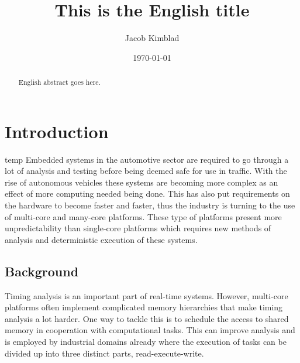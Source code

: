 \documentclass{kththesis}
\title{This is the English title}
\author{Jacob Kimblad}
\date{\today}
\begin{document}

\frontmatter

\titlepage

\begin{abstract} 

    English abstract goes here.

\end{abstract}


\begin{otherlanguage}{swedish} 
    
    \begin{abstract}

    \end{abstract} 

\end{otherlanguage}

\printglossary[title={Acronyms}]


\mainmatter


\chapter{Introduction} 
temp
Embedded systems in the automotive sector are required to go through a lot of analysis and testing
before being deemed safe for use in traffic. With the rise of autonomous vehicles these systems are
becoming more complex as an effect of more computing needed being done.  This has also put
requirements on the hardware to become faster and faster, thus the industry is turning to the use of
multi-core and many-core platforms. These type of platforms present more unpredictability than
single-core platforms which requires new methods of analysis and deterministic execution of these
systems. 


\section{Background} 

Timing analysis is an important part of real-time systems. However, multi-core platforms often
implement complicated memory hierarchies that make timing analysis a lot harder. One way to tackle
this is to schedule the access to shared memory in cooperation with computational tasks. This can
improve analysis and is employed by industrial domains already where the execution of tasks can be
divided up into three distinct parts, read-execute-write.
\end{document}
